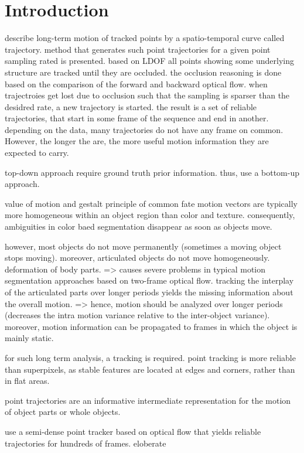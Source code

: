 \chapter{Introduction}

describe long-term motion of tracked points by a spatio-temporal curve called trajectory.
method that generates such point trajectories for a given point sampling rated is presented. 
based on LDOF all points showing some underlying structure are tracked until they are occluded. the occlusion reasoning is done based on the comparison of the forward and backward optical flow. when trajectroies get lost due to occlusion such that the sampling is sparser than the desidred rate, a new trajectory is started. the result is a set of reliable trajectories, that start in some frame of the sequence and end in another. depending on the data, many trajectories do not have any frame on common. However, the longer the are, the more useful motion information they are expected to carry. 

top-down approach require ground truth prior information.
thus, use a bottom-up approach.

value of motion and gestalt principle of common fate
motion vectors are typically more homogeneous within an object region than color and texture. consequently, ambiguities in color baed segmentation disappear as soon as objects move.

however, most objects do not move permanently (sometimes a moving object stops moving). moreover, articulated objects do not move homogeneously. deformation of body parts.
=> causes severe problems in typical motion segmentation approaches based on two-frame optical flow.
tracking the interplay of the articulated parts over longer periods yields the missing information about the overall motion.
=> hence, motion should be analyzed over longer periods (decreases the intra motion variance relative to the inter-object variance). moreover, motion information can be propagated to frames in which the object is mainly static.

for such long term analysis, a tracking is required.
point tracking is more reliable than superpixels, as stable features are located at edges and corners, rather than in flat areas.

point trajectories are an informative intermediate representation for the motion of object parts or whole objects.

use a semi-dense point tracker based on optical flow that yields reliable trajectories for hundreds of frames.
eloberate

